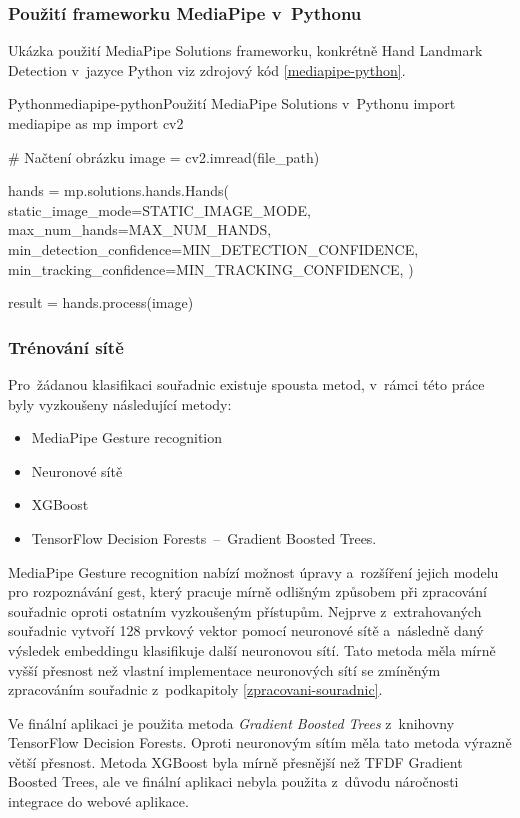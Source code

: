 \documentclass[
  master,
  program=ainfvs,
  biblatex,
  figures=true,
  tables=false,
  sourcecodes=true,
  glossaries,
  index
]{kidiplom}
\begin{document}
        \subsubsection{Použití frameworku MediaPipe v~Pythonu}
        Ukázka použití MediaPipe Solutions frameworku, konkrétně Hand Landmark Detection v~jazyce Python viz zdrojový kód \ref{mediapipe-python}.
        
        \begin{kicode}{Python}{mediapipe-python}{Použití MediaPipe Solutions v~Pythonu}
import mediapipe as mp
import cv2

# Načtení obrázku
image = cv2.imread(file_path)

hands = mp.solutions.hands.Hands(
    static_image_mode=STATIC_IMAGE_MODE,
    max_num_hands=MAX_NUM_HANDS,
    min_detection_confidence=MIN_DETECTION_CONFIDENCE,
    min_tracking_confidence=MIN_TRACKING_CONFIDENCE,
)

result = hands.process(image)
        \end{kicode}
        
        \subsubsection{Trénování sítě}
           Pro~žádanou klasifikaci souřadnic existuje spousta metod, v~rámci této práce byly vyzkoušeny následující metody:

           \begin{itemize}
                \item MediaPipe Gesture recognition
                \item Neuronové sítě
                \item XGBoost
                \item TensorFlow Decision Forests~--~Gradient Boosted Trees.
            \end{itemize}

        MediaPipe Gesture recognition nabízí možnost úpravy a~rozšíření jejich modelu pro rozpoznávání gest, který pracuje mírně odlišným způsobem při zpracování souřadnic oproti ostatním vyzkoušeným přístupům. Nejprve z~extrahovaných souřadnic vytvoří 128 prvkový vektor pomocí neuronové sítě a~následně daný výsledek embeddingu klasifikuje další neuronovou sítí. Tato metoda měla mírně vyšší přesnost než vlastní implementace neuronových sítí se zmíněným zpracováním souřadnic z~podkapitoly \ref{zpracovani-souradnic}.
    
       Ve finální aplikaci je použita metoda \emph{Gradient Boosted Trees} z~knihovny TensorFlow Decision Forests. Oproti neuronovým sítím měla tato metoda výrazně větší přesnost. Metoda XGBoost byla mírně přesnější než TFDF Gradient Boosted Trees, ale ve finální aplikaci nebyla použita z~důvodu náročnosti integrace do webové aplikace. 
        
\end{document}
